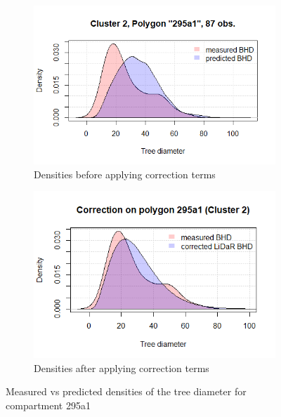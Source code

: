 \begin{figure}[H]
\centering
\begin{subfigure}{.5\textwidth}
  \centering
  \includegraphics[width=.9\linewidth]{cluster2_295a1_87.png}
  \caption{Densities before applying correction terms}
  \label{fig:polygon_before_295a1}
\end{subfigure}%
\begin{subfigure}{.5\textwidth}
  \centering
  \includegraphics[width=0.853\linewidth]{corrected_cluster2_295a1.png}
  \caption{Densities after applying correction terms}
  \label{fig:polygon_after_295a1}
\end{subfigure}
\caption{Measured vs predicted densities of the tree diameter for compartment 295a1}
\label{fig:correction_polygon_295a1}
\end{figure}

